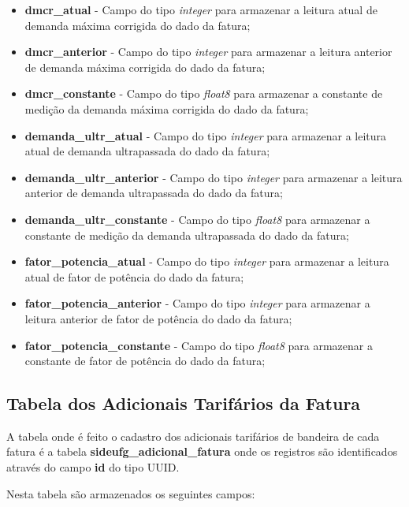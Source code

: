 \begin{itemize}
    \item \textbf{dmcr\_atual} - Campo do tipo \textit{integer} para armazenar a leitura atual de demanda máxima corrigida do dado da fatura;
    \item \textbf{dmcr\_anterior} - Campo do tipo \textit{integer} para armazenar a leitura anterior de demanda máxima corrigida do dado da fatura;
    \item \textbf{dmcr\_constante} - Campo do tipo \textit{float8} para armazenar a constante de medição da demanda máxima corrigida  do dado da fatura;
    
    \item \textbf{demanda\_ultr\_atual} - Campo do tipo \textit{integer} para armazenar a leitura atual de demanda ultrapassada do dado da fatura;
    \item \textbf{demanda\_ultr\_anterior} - Campo do tipo \textit{integer} para armazenar a leitura anterior de demanda ultrapassada do dado da fatura;
    \item \textbf{demanda\_ultr\_constante} - Campo do tipo \textit{float8} para armazenar a constante de medição da demanda ultrapassada do dado da fatura;
    
    \item \textbf{fator\_potencia\_atual} - Campo do tipo \textit{integer} para armazenar a leitura atual de fator de potência do dado da fatura;
    \item \textbf{fator\_potencia\_anterior} - Campo do tipo \textit{integer} para armazenar a leitura anterior de fator de potência do dado da fatura;
    \item \textbf{fator\_potencia\_constante} - Campo do tipo \textit{float8} para armazenar a constante de fator de potência do dado da fatura;
    
    
\end{itemize}

\subsection{Tabela dos Adicionais Tarifários da Fatura}
\label{sub:tabela-adicional-fatura}

A tabela onde é feito o cadastro dos adicionais tarifários de bandeira de cada fatura é a tabela \textbf{sideufg\_adicional\_fatura} onde os registros são identificados através do campo \textbf{id} do tipo UUID.

Nesta tabela são armazenados os seguintes campos:


